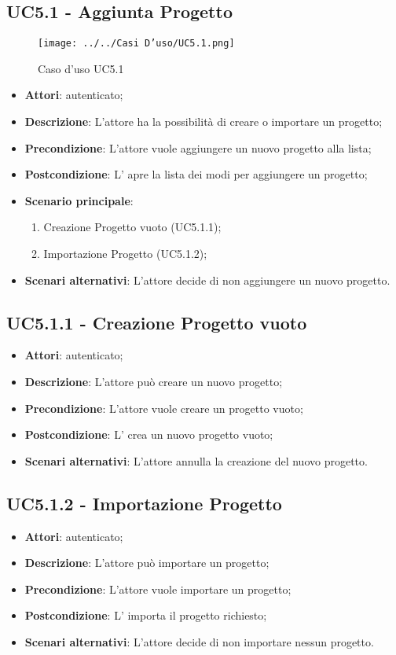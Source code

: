 \subsection{UC5.1 - Aggiunta Progetto}
\label{ssec:UC5.1}
\begin{figure}[h!]
\centering
\texttt{[image: ../../Casi D'uso/UC5.1.png]}
\caption{Caso d'uso UC5.1}
 \end{figure}
\begin{itemize}
\item \textbf{Attori}:  autenticato;
\item \textbf{Descrizione}: L’attore ha la possibilità di creare o importare un progetto;
\item \textbf{Precondizione}: L’attore vuole aggiungere un nuovo progetto alla lista;
\item \textbf{Postcondizione}: L’ apre la lista dei modi per aggiungere un progetto;
\item \textbf{Scenario principale}: \begin{enumerate}\item Creazione Progetto vuoto (UC5.1.1);\item Importazione Progetto (UC5.1.2);
 \end{enumerate}
\item \textbf{Scenari alternativi}: L'attore decide di non aggiungere un nuovo progetto.
\end{itemize}
\subsection{UC5.1.1 - Creazione Progetto vuoto}
\label{ssec:UC5.1.1}
\begin{itemize}
\item \textbf{Attori}:  autenticato;
\item \textbf{Descrizione}: L'attore può creare un nuovo progetto;
\item \textbf{Precondizione}: L'attore vuole creare un progetto vuoto;
\item \textbf{Postcondizione}: L' crea un nuovo progetto vuoto;
\item \textbf{Scenari alternativi}: L'attore annulla la creazione del nuovo progetto.
\end{itemize}
\newpage
\subsection{UC5.1.2 - Importazione Progetto}
\label{ssec:UC5.1.2}
\begin{itemize}
\item \textbf{Attori}:  autenticato;
\item \textbf{Descrizione}: L'attore può importare un progetto;
\item \textbf{Precondizione}: L'attore vuole importare un progetto;
\item \textbf{Postcondizione}: L' importa il progetto richiesto;
\item \textbf{Scenari alternativi}: L'attore decide di non importare nessun progetto.
\end{itemize}
